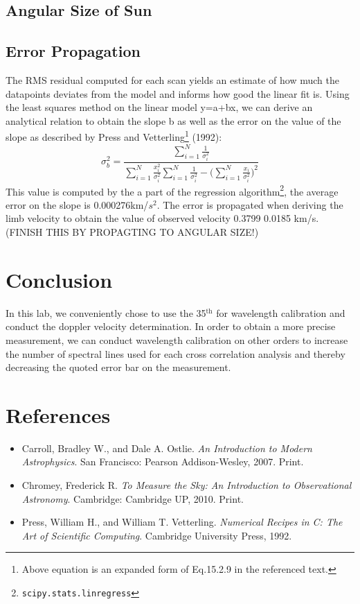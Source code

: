 \documentclass[authoryear, 12pt,5p, times]{elsarticle}
\newcommand{\rpm}{\raisebox{.3ex}{$\scriptstyle\pm$}}
\begin{document}
\subsection{Angular Size of Sun}
\label{size_calc}
\subsection{Error Propagation}
The RMS residual  computed for each scan yields an estimate of how much the datapoints deviates from the model and informs how good the linear fit is.  Using the least squares method on the linear model y=a+bx, we can derive an analytical relation to obtain the slope b as well as the error on the value of the slope as described by Press and Vetterling\footnote{Above equation is an expanded form of  Eq.15.2.9 in the referenced text.}  (1992): 
\begin{equation}
\sigma_b^2 = \frac{\sum\limits_{i=1}^N\frac{1}{\sigma_i^2}}{\sum\limits_{i=1}^N\frac{x_i^2}{\sigma_i^2}\sum\limits_{i=1}^N\frac{1}{\sigma_i^2}-\Big(\sum\limits_{i=1}^N\frac{x_i}{\sigma_i^2}\Big)^2}
\label{ls}
\end{equation}
This value is computed by the a part of the regression algorithm\footnote{\texttt{scipy.stats.linregress}}, the average error on the slope is 0.000276km/$s^2$. The error is propagated when deriving the limb velocity to obtain the value of observed velocity  0.3799 \rpm 0.0185 km/s. (FINISH THIS BY PROPAGTING TO ANGULAR SIZE!)
\section{Conclusion}
In this lab, we conveniently chose to use the 35$^\text{th}$ for wavelength calibration and conduct the doppler velocity determination. In order to obtain a more precise measurement, we can conduct wavelength calibration on other orders to increase the number of spectral lines used for each cross correlation analysis and thereby decreasing the quoted error bar on the measurement.
 \section*{References}
 \begin{footnotesize}
 \begin{itemize}
 \item Carroll, Bradley W., and Dale A. Ostlie. \textit{An Introduction to Modern Astrophysics}. San Francisco: Pearson Addison-Wesley, 2007. Print.
\item Chromey, Frederick R. \textit{To Measure the Sky: An Introduction to Observational Astronomy}. Cambridge: Cambridge UP, 2010. Print.
\item Press, William H., and William T. Vetterling. \textit{Numerical Recipes in C: The Art of Scientific Computing}. Cambridge University Press, 1992.  
\end{itemize}
% 
%
  \end{footnotesize}
\end{document}
